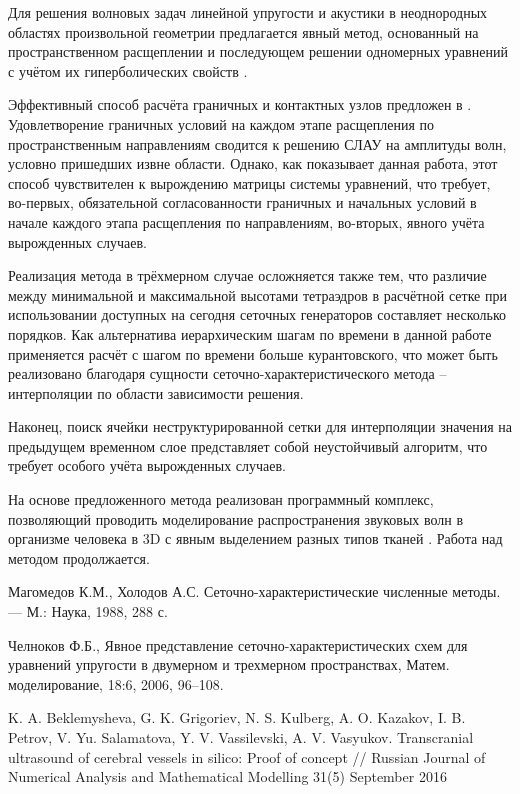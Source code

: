 \documentclass[twocolumn]{article}
\begin{document}
Для решения волновых задач линейной упругости и акустики в неоднородных областях произвольной геометрии предлагается явный метод, основанный на пространственном расщеплении и последующем решении одномерных уравнений с учётом их гиперболических свойств \cite{alexanderkazak_magomedov_kholodov_1988}.

Эффективный способ расчёта граничных и контактных узлов предложен в \cite{alexanderkazak_chelnokov}. Удовлетворение граничных условий на каждом этапе расщепления по пространственным направлениям сводится к решению СЛАУ на амплитуды волн, условно пришедших извне области.
Однако, как показывает данная работа, этот способ чувствителен к вырождению матрицы системы уравнений, что требует, во-первых, обязательной согласованности граничных и начальных условий в начале каждого этапа расщепления по направлениям, во-вторых, явного учёта вырожденных случаев.

Реализация метода в трёхмерном случае осложняется также тем, что различие между минимальной и максимальной высотами  тетраэдров в расчётной сетке при использовании доступных на сегодня сеточных генераторов составляет несколько порядков. Как альтернатива иерархическим шагам по времени в данной работе применяется расчёт с шагом по времени больше курантовского, что может быть реализовано благодаря сущности сеточно-характеристического метода -- интерполяции по области зависимости решения.

Наконец, поиск ячейки неструктурированной сетки для интерполяции значения на предыдущем временном слое представляет собой неустойчивый алгоритм, что требует особого учёта вырожденных случаев.

На основе предложенного метода реализован программный комплекс, позволяющий проводить моделирование распространения звуковых волн в организме человека в 3D с явным выделением разных типов тканей \cite{alexanderkazak_transcranial_ultrasound}. Работа над методом продолжается.

\begin{thebibliography}{9}

 Магомедов К.М., Холодов А.С. Сеточно-характеристические численные методы. — М.: Наука, 1988, 288 с.

 Челноков Ф.Б., Явное представление сеточно-характеристических схем для уравнений упругости в двумерном и трехмерном пространствах, Матем. моделирование, 18:6, 2006, 96–108.

 K. A. Beklemysheva, G. K. Grigoriev, N. S. Kulberg, A. O. Kazakov, I. B. Petrov, V. Yu. Salamatova, Y. V. Vassilevski, A. V. Vasyukov. Transcranial ultrasound of cerebral vessels in silico: Proof of concept // Russian Journal of Numerical Analysis and Mathematical Modelling 31(5) September 2016

\end{thebibliography}
\end{document}
